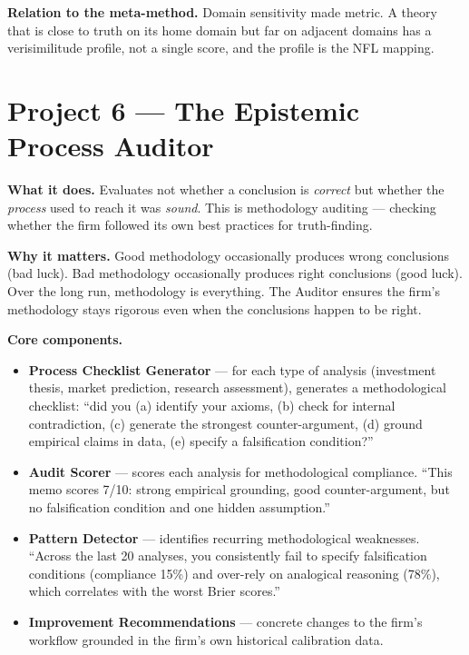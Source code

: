 \documentclass[11pt,letterpaper]{article}
\begin{document}
\textbf{Relation to the meta-method.} Domain sensitivity made metric. A theory that is close to truth on its home domain but far on adjacent domains has a verisimilitude profile, not a single score, and the profile is the NFL mapping.

\section{Project 6 --- The Epistemic Process Auditor}

\textbf{What it does.} Evaluates not whether a conclusion is \emph{correct} but whether the \emph{process} used to reach it was \emph{sound}. This is methodology auditing --- checking whether the firm followed its own best practices for truth-finding.

\textbf{Why it matters.} Good methodology occasionally produces wrong conclusions (bad luck). Bad methodology occasionally produces right conclusions (good luck). Over the long run, methodology is everything. The Auditor ensures the firm's methodology stays rigorous even when the conclusions happen to be right.

\textbf{Core components.}

\begin{itemize}[leftmargin=1.5em,itemsep=0.1em]
\item \textbf{Process Checklist Generator} --- for each type of analysis (investment thesis, market prediction, research assessment), generates a methodological checklist: ``did you (a) identify your axioms, (b) check for internal contradiction, (c) generate the strongest counter-argument, (d) ground empirical claims in data, (e) specify a falsification condition?''
\item \textbf{Audit Scorer} --- scores each analysis for methodological compliance. ``This memo scores 7/10: strong empirical grounding, good counter-argument, but no falsification condition and one hidden assumption.''
\item \textbf{Pattern Detector} --- identifies recurring methodological weaknesses. ``Across the last 20 analyses, you consistently fail to specify falsification conditions (compliance 15\%) and over-rely on analogical reasoning (78\%), which correlates with the worst Brier scores.''
\item \textbf{Improvement Recommendations} --- concrete changes to the firm's workflow grounded in the firm's own historical calibration data.
\end{itemize}
\end{document}
